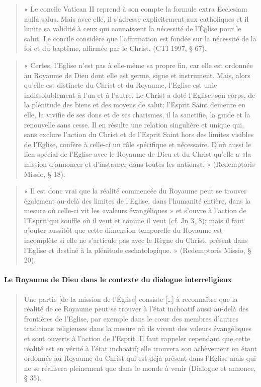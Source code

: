     
\begin{quote}
    « Le concile Vatican II reprend à son compte la formule extra Ecclesiam nulla salus. Mais avec elle, il s’adresse explicitement aux catholiques et il limite sa validité à ceux qui connaissent la nécessité de l’Église pour le salut. Le concile considère que l’affirmation est fondée sur la nécessité de la foi et du baptême, affirmée par le Christ. (CTI 1997, § 67). 
\end{quote}

\begin{quote}
    « Certes, l'Eglise n'est pas à elle-même sa propre fin, car elle est ordonnée au Royaume de Dieu dont elle est germe, signe et instrument. Mais, alors qu'elle est distincte du Christ et du Royaume, l'Eglise est unie indissolublement à l'un et à l'autre. Le Christ a doté l'Eglise, son corps, de la plénitude des biens et des moyens de salut; l'Esprit Saint demeure en elle, la vivifie de ses dons et de ses charismes, il la sanctifie, la guide et la renouvelle sans cesse. Il en résulte une relation singulière et unique qui, sans exclure l'action du Christ et de l'Esprit Saint hors des limites visibles de l'Eglise, confère à celle-ci un rôle spécifique et nécessaire. D'où aussi le lien spécial de l'Eglise avec le Royaume de Dieu et du Christ qu'elle a «la mission d'annoncer et d'instaurer dans toutes les nations». » (Redemptoris Missio, § 18).  
\end{quote}

\begin{quote}
    « Il est donc vrai que la réalité commencée du Royaume peut se trouver également au-delà des limites de l'Eglise, dans l'humanité entière, dans la mesure où celle-ci vit les «valeurs évangéliques » et s'ouvre à l'action de l'Esprit qui souffle où il veut et comme il veut (cf. Jn 3, 8); mais il faut ajouter aussitôt que cette dimension temporelle du Royaume est incomplète si elle ne s'articule pas avec le Règne du Christ, présent dans l'Eglise et destiné à la plénitude eschatologique. » (Redemptoris Missio, § 20). 
\end{quote}
    
\paragraph{Le Royaume de Dieu dans le contexte du dialogue interreligieux} 
\begin{quote}
    Une partie [de la mission de l’Église] consiste […] à reconnaître que la réalité de ce Royaume peut se trouver à l’état inchoatif aussi au-delà des frontières de l’Eglise, par exemple dans le cœur des membres d’autres traditions religieuses dans la mesure où ils vivent des valeurs évangéliques et sont ouverts à l’action de l’Esprit. Il faut rappeler cependant que cette réalité est en vérité à l’état inchoatif; elle trouvera son achèvement en étant ordonnée au Royaume du Christ qui est déjà présent dans l’Eglise mais qui ne se réalisera pleinement que dans le monde à venir (Dialogue et annonce,  § 35). 
\end{quote}

